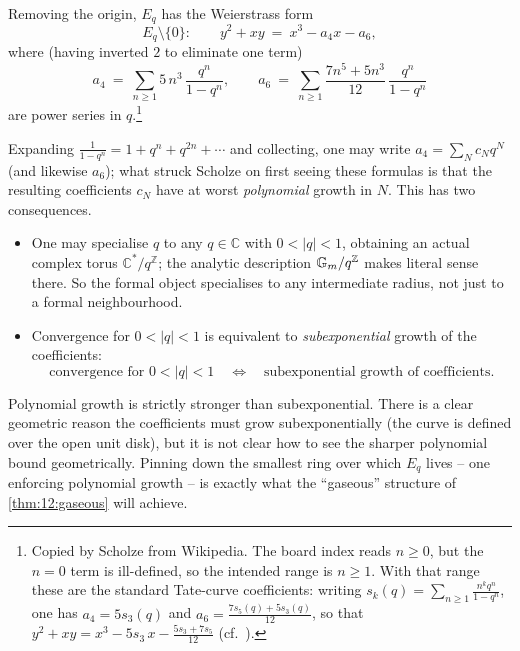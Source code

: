 \begin{proposition}
\label{prop:12:weierstrass}
Removing the origin, $E_q$ has the Weierstrass form
\begin{equation*}
E_q\setminus\{0\}:\qquad y^{2}+xy\ =\ x^{3}-a_{4}x-a_{6},
\end{equation*}
where (having inverted $2$ to eliminate one term)
\begin{equation*}
a_{4}\ =\ \sum_{n\ge 1} 5\,n^{3}\,\frac{q^{n}}{1-q^{n}},
\qquad
a_{6}\ =\ \sum_{n\ge 1}\frac{7n^{5}+5n^{3}}{12}\,\frac{q^{n}}{1-q^{n}}
\end{equation*}
are power series in $q$.\footnote{Copied by Scholze from Wikipedia. The board
index reads $n\ge 0$, but the $n=0$ term is ill-defined, so the intended range
is $n\ge 1$. With that range these are the standard Tate-curve coefficients:
writing $s_k(q)=\sum_{n\ge1}\tfrac{n^k q^n}{1-q^n}$, one has $a_4=5s_3(q)$ and
$a_6=\tfrac{7s_5(q)+5s_3(q)}{12}$, so that
$y^2+xy=x^3-5s_3\,x-\tfrac{5s_3+7s_5}{12}$ (cf.\ \cite[Ch.~V]{Silverman_1994}).}
\end{proposition}

\begin{remark}
\label{rmk:12:polynomial-growth}
Expanding $\tfrac{1}{1-q^{n}}=1+q^{n}+q^{2n}+\cdots$ and collecting, one may
write $a_{4}=\sum_{N} c_{N}q^{N}$ (and likewise $a_6$); what struck Scholze on
first seeing these formulas is that the resulting coefficients $c_N$ have at
worst \emph{polynomial} growth in $N$. This has two consequences.
\begin{itemize}
\item One may specialise $q$ to any $q\in\mathbb{C}$ with $0<|q|<1$, obtaining an
actual complex torus $\mathbb{C}^{\ast}/q^{\mathbb{Z}}$; the analytic description
$\mathbb{G}_{m}/q^{\mathbb{Z}}$ makes literal sense there. So the formal object
specialises to any intermediate radius, not just to a formal neighbourhood.
\item Convergence for $0<|q|<1$ is equivalent to \emph{subexponential} growth of
the coefficients:
\begin{equation*}
\text{convergence for } 0<|q|<1\quad\Longleftrightarrow\quad
\text{subexponential growth of coefficients.}
\end{equation*}
\end{itemize}
Polynomial growth is strictly stronger than subexponential. There is a clear
geometric reason the coefficients must grow subexponentially (the curve is
defined over the open unit disk), but it is not clear how to see the sharper
polynomial bound geometrically. Pinning down the smallest ring over which $E_q$
lives -- one enforcing polynomial growth -- is exactly what the ``gaseous''
structure of \cref{thm:12:gaseous} will achieve.
\end{remark}

